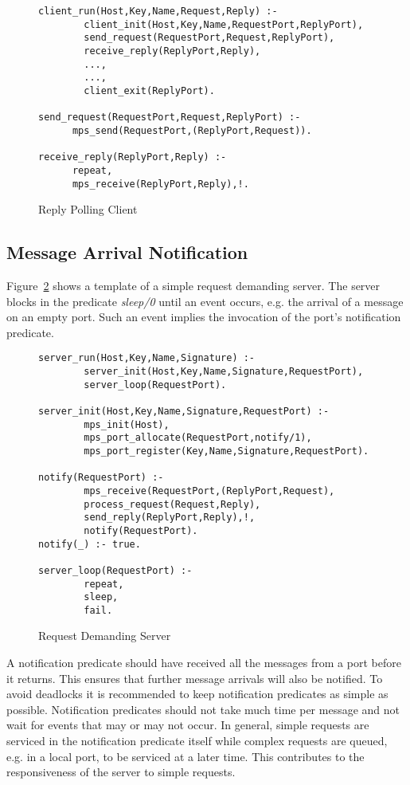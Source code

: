 \begin{figure} 
\begin{verbatim}
client_run(Host,Key,Name,Request,Reply) :- 
        client_init(Host,Key,Name,RequestPort,ReplyPort),
        send_request(RequestPort,Request,ReplyPort),
        receive_reply(ReplyPort,Reply),
        ...,
        ...,
        client_exit(ReplyPort).
        
send_request(RequestPort,Request,ReplyPort) :- 
      mps_send(RequestPort,(ReplyPort,Request)).

receive_reply(ReplyPort,Reply) :- 
      repeat,
      mps_receive(ReplyPort,Reply),!.
\end{verbatim}
\caption{\label{fig:client_polling} {Reply Polling Client}}
\end{figure}

\subsection{Message Arrival Notification}

Figure~\ref{fig:server_interrupt} shows a template of a simple request
demanding server. The server blocks in the predicate {\it sleep/0} until
an event occurs, e.g. the arrival of a message on an empty port. Such
an event implies the invocation of the port's notification predicate.

\begin{figure}[hbt]
\begin{verbatim}
server_run(Host,Key,Name,Signature) :- 
        server_init(Host,Key,Name,Signature,RequestPort),
        server_loop(RequestPort).

server_init(Host,Key,Name,Signature,RequestPort) :- 
        mps_init(Host),
        mps_port_allocate(RequestPort,notify/1),
        mps_port_register(Key,Name,Signature,RequestPort).

notify(RequestPort) :- 
        mps_receive(RequestPort,(ReplyPort,Request),
        process_request(Request,Reply),
        send_reply(ReplyPort,Reply),!,
        notify(RequestPort).
notify(_) :- true. 

server_loop(RequestPort) :- 
        repeat,
        sleep,
        fail.
\end{verbatim}
\caption{\label{fig:server_interrupt} {Request Demanding Server}}
\end{figure} 

A notification predicate should have received all the messages from a port 
before it returns. This ensures that further message arrivals will also
be notified. To avoid deadlocks it is recommended to keep notification
predicates as simple as possible. Notification predicates should not take 
much time per message and not wait for events that may or may not occur.
In general, simple requests are serviced in the notification predicate
itself while complex requests are queued, e.g. in a local port, to be
serviced at a later time. This contributes to the responsiveness of the
server to simple requests.

